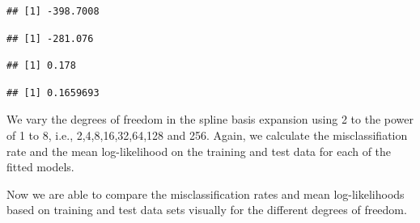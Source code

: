 \documentclass[
]{article}
\begin{document}
\begin{verbatim}
## [1] -398.7008
\end{verbatim}

\begin{verbatim}
## [1] -281.076
\end{verbatim}

\begin{verbatim}
## [1] 0.178
\end{verbatim}

\begin{verbatim}
## [1] 0.1659693
\end{verbatim}

We vary the degrees of freedom in the spline basis expansion using 2 to
the power of 1 to 8, i.e., 2,4,8,16,32,64,128 and 256. Again, we
calculate the misclassifiation rate and the mean log-likelihood on the
training and test data for each of the fitted models.

Now we are able to compare the misclassification rates and mean
log-likelihoods based on training and test data sets visually for the
different degrees of freedom.
\end{document}
